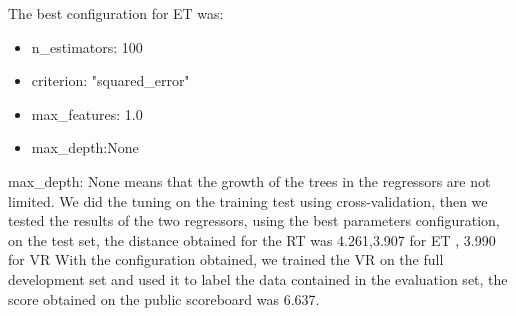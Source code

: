 \documentclass[conference]{IEEEtran}
\begin{document}
The best configuration for ET was:
\begin{itemize}
    \item n\_estimators: 100
    \item criterion: "squared\_error"
    \item max\_features: 1.0
    \item max\_depth:None
\end{itemize}
max\_depth: None means that the growth of the trees in the regressors are not limited.
We did the tuning on the training test using cross-validation, then we tested the results of the two regressors, using the best parameters configuration, on the test set, the 
distance obtained for the RT was 4.261,3.907 for ET , 3.990 for VR
With the configuration obtained, we trained the VR on the full development set and used it to label the data contained in the evaluation set, the score obtained on the public
scoreboard was 6.637.
\end{document}
